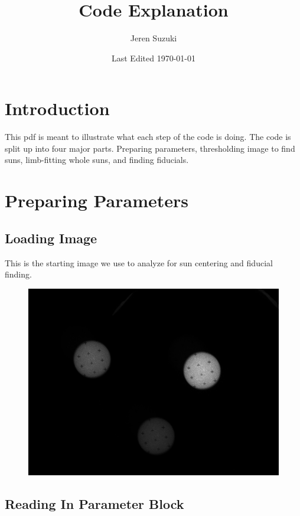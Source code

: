 \documentclass[10pt]{scrartcl}
\title{Code Explanation}
\author{Jeren Suzuki}
\date{Last Edited \today}
\begin{document}
\maketitle
{}
\tableofcontents
\clearpage
{}

\section{Introduction} %
\label{sec:introduction}
This pdf is meant to illustrate what each step of the code is doing. The code is split up into four major parts. Preparing parameters, thresholding image to find suns, limb-fitting whole suns, and finding fiducials. 

\section{Preparing Parameters} %
\label{sec:preparing_parameters}

\subsection{Loading Image} %
\label{sub:loading_image}
This is the starting image we use to analyze for sun centering and fiducial finding.
\begin{figure}[!ht]
    \centering
    \includegraphics[width=.9\textwidth]{../plots_tables_images/tritest.jpg}    
    \caption{}
    \label{flowchart}
\end{figure}


\subsection{Reading In Parameter Block} %
\label{sub:reading_in_parameter_block}
\end{document}
